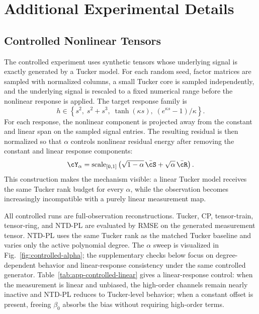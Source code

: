 \section{Additional Experimental Details}
\label{app:experimental_details}

\subsection{Controlled Nonlinear Tensors}
\label{app:controlled_details}

The controlled experiment uses synthetic tensors whose underlying signal is exactly
generated by a Tucker model. For each random seed, factor matrices are sampled
with normalized columns, a small Tucker core is sampled independently, and the
underlying signal is rescaled to a fixed numerical range before the nonlinear
response is applied. The target response family is
\begin{equation}
  h \in
  \left\{
  s^2,\;
  s^2+s^3,\;
  \tanh(\kappa s),\;
  (e^{\kappa s}-1)/\kappa
  \right\}.
\end{equation}
For each response, the nonlinear component is projected away from the constant
and linear span on the sampled signal entries. The resulting residual is then
normalized so that $\alpha$ controls nonlinear residual energy after removing
the constant and linear response components:
\begin{equation}
  \cY_\alpha =
  \mathrm{scale}_{[0,1]}
  \left(
  \sqrt{1-\alpha}\,\bar{\cS}
  +
  \sqrt{\alpha}\,\bar{\cR}
  \right).
\end{equation}
This construction makes the mechanism visible: a linear Tucker model receives
the same Tucker rank budget for every $\alpha$, while the observation becomes
increasingly incompatible with a purely linear measurement map.

All controlled runs are full-observation reconstructions. Tucker, CP,
tensor-train, tensor-ring, and NTD-PL are evaluated by RMSE on the generated
measurement tensor. NTD-PL uses the same Tucker rank as the matched Tucker
baseline and varies only the active polynomial degree. The $\alpha$ sweep is
visualized in Fig.~\ref{fig:controlled-alpha}; the supplementary checks below
focus on degree-dependent behavior and linear-response consistency under the
same controlled generator.
Table~\ref{tab:app-controlled-linear} gives a linear-response control: when
the measurement is linear and unbiased, the high-order channels remain nearly
inactive and NTD-PL reduces to Tucker-level behavior; when a constant offset is
present, freeing $\beta_0$ absorbs the bias without requiring high-order terms.

